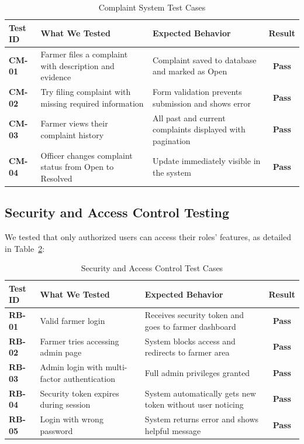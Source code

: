 \begin{table}[htbp]
  \centering
  \caption{Complaint System Test Cases}
  \label{tab:complainttestcases}
  \renewcommand{\arraystretch}{1.35}
  \begin{tabularx}{\textwidth}{@{} l X X c @{}}
    \toprule
    \textbf{Test ID} & \textbf{What We Tested} & \textbf{Expected Behavior} & \textbf{Result} \\
    \midrule
    \textbf{CM-01} & Farmer files a complaint with description and evidence & Complaint saved to database and marked as Open & \textbf{Pass} \\
    \addlinespace
    \textbf{CM-02} & Try filing complaint with missing required information & Form validation prevents submission and shows error & \textbf{Pass} \\
    \addlinespace
    \textbf{CM-03} & Farmer views their complaint history & All past and current complaints displayed with pagination & \textbf{Pass} \\
    \addlinespace
    \textbf{CM-04} & Officer changes complaint status from Open to Resolved & Update immediately visible in the system & \textbf{Pass} \\
    \bottomrule
  \end{tabularx}
\end{table}

\subsection{Security and Access Control Testing}

We tested that only authorized users can access their roles' features, as detailed in Table~\ref{tab:rbactestcases}:

\begin{table}[htbp]
  \centering
  \caption{Security and Access Control Test Cases}
  \label{tab:rbactestcases}
  \renewcommand{\arraystretch}{1.35}
  \begin{tabularx}{\textwidth}{@{} l X X c @{}}
    \toprule
    \textbf{Test ID} & \textbf{What We Tested} & \textbf{Expected Behavior} & \textbf{Result} \\
    \midrule
    \textbf{RB-01} & Valid farmer login & Receives security token and goes to farmer dashboard & \textbf{Pass} \\
    \addlinespace
    \textbf{RB-02} & Farmer tries accessing admin page & System blocks access and redirects to farmer area & \textbf{Pass} \\
    \addlinespace
    \textbf{RB-03} & Admin login with multi-factor authentication & Full admin privileges granted & \textbf{Pass} \\
    \addlinespace
    \textbf{RB-04} & Security token expires during session & System automatically gets new token without user noticing & \textbf{Pass} \\
    \addlinespace
    \textbf{RB-05} & Login with wrong password & System returns error and shows helpful message & \textbf{Pass} \\
    \bottomrule
  \end{tabularx}
\end{table}


